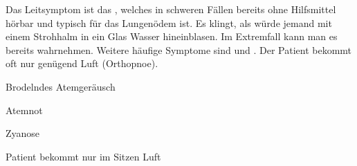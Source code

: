 {%
%
Das Leitsymptom ist das , welches
in schweren Fällen bereits ohne Hilfsmittel hörbar und
typisch für das Lungenödem ist. Es klingt, als würde jemand
mit einem Strohhalm in ein Glas Wasser hineinblasen. Im
Extremfall kann man es bereits  wahrnehmen.
Weitere häufige Symptome sind  und .
Der Patient bekommt oft nur  genügend
Luft (Orthopnoe).
}{
\begin{compactitem}
  \item Brodelndes Atemgeräusch
  \item Atemnot
  \item Zyanose
  \item Patient bekommt nur im Sitzen Luft
\end{compactitem}
}{}{}{}

